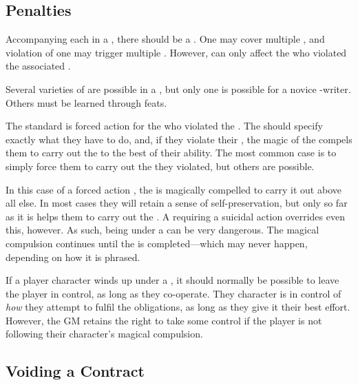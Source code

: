 \subsection{Penalties}

Accompanying each {\stipulation} in a {\contract}, there should be a {\contractpenalty}.
One {\contractpenalty} may cover multiple {\stipulations}, and violation of one {\stipulation} may trigger multiple {\penalties}.
However, {\penalties} can only affect the {\signatories} who violated the associated {\stipulations}.

Several varieties of {\contractpenalty} are possible in a {\contract}, but only one is possible for a novice {\contract}-writer.
Others must be learned through feats.

The standard {\contractpenalty} is forced action for the {\signatory} who violated the {\stipulation}.
The {\contract} should specify exactly what they have to do, and, if they violate their {\stipulation}, the magic of the {\contract} compels them to carry out the {\contractpenalty} to the best of their ability.
The most common case is to simply force them to carry out the {\stipulation} they violated, but others are possible.

In this case of a forced action {\contractpenalty}, the {\penalised} {\signatory} is magically compelled to carry it out above all else.
In most cases they will retain a sense of self-preservation, but only so far as it is helps them to carry out the {\contractpenalty}.
A {\contractpenalty} requiring a suicidal action overrides even this, however.
As such, being under a {\contractpenalty} can be very dangerous.
The magical compulsion continues until the {\contractpenalty} is completed---which may never happen, depending on how it is phrased.

If a player character winds up under a {\contractpenalty}, it should normally be possible to leave the player in control, as long as they co-operate.
They character is in control of \emph{how} they attempt to fulfil the {\penaltypossessive} obligations, as long as they give it their best effort.
However, the GM retains the right to take some control if the player is not following their character's magical compulsion.

\subsection{Voiding a Contract}

